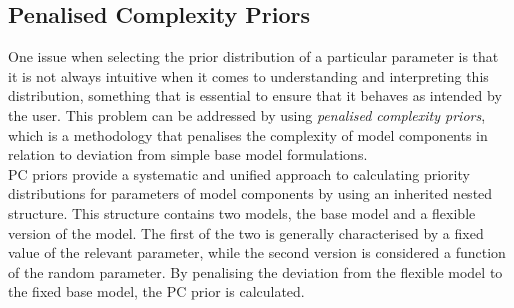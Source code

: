 \documentclass[12pt]{book}
\begin{document}
\subsection{Penalised Complexity Priors}
One issue when selecting the prior distribution of a particular parameter is that it is not always intuitive when it comes to understanding and interpreting this distribution, something that is essential to ensure that it behaves as intended by the user. This problem can be addressed by using \textit{penalised complexity priors}, which is a methodology that penalises the complexity of model components in relation to deviation from simple base model formulations.\\
PC priors provide a systematic and unified approach to calculating priority distributions for parameters of model components by using an inherited nested structure. This structure contains two models, the base model and a flexible version of the model. The first of the two is generally characterised by a fixed value of the relevant parameter, while the second version is considered a function of the random parameter. By penalising the deviation from the flexible model to the fixed base model, the PC prior is calculated.
\end{document}
